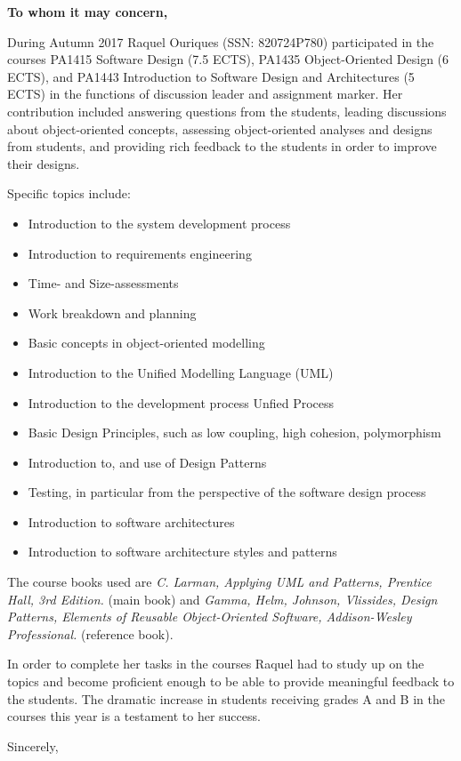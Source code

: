 \documentclass{letter}
\begin{document}
\begin{letter}{\bf To whom it may concern,}
  \opening{}

  During Autumn 2017 Raquel Ouriques (SSN: 820724P780) participated in the courses PA1415 Software Design (7.5 ECTS), PA1435 Object-Oriented Design (6 ECTS), and PA1443 Introduction to Software Design and Architectures (5 ECTS) in the functions of discussion leader and assignment marker. Her contribution included answering questions from the students, leading discussions about object-oriented concepts, assessing object-oriented analyses and designs from students, and providing rich feedback to the students in order to improve their designs.

  Specific topics include:
  \begin{scriptsize}
\begin{itemize}  
\item Introduction to the system development process
\item Introduction to requirements engineering
\item Time- and Size-assessments
\item Work breakdown and planning  
\item Basic concepts in object-oriented modelling
\item Introduction to the Unified Modelling Language (UML)
\item Introduction to the development process Unfied Process
\item Basic Design Principles, such as low coupling, high cohesion, polymorphism
\item Introduction to, and use of Design Patterns
\item Testing, in particular from the perspective of the software design process
\item Introduction to software architectures
\item Introduction to software architecture styles and patterns
\end{itemize}
\end{scriptsize}

The course books used are \emph{C. Larman, Applying UML and Patterns, Prentice Hall, 3rd Edition.} (main book) and \emph{Gamma, Helm, Johnson, Vlissides, Design Patterns, Elements of Reusable Object-Oriented Software, Addison-Wesley Professional.} (reference book).


In order to complete her tasks in the courses Raquel had to study up on the topics and become proficient enough to be able to provide meaningful feedback to the students. The dramatic increase in students receiving grades A and B in the courses this year is a testament to her success.

\closing{Sincerely,}
\end{letter}
\end{document}
